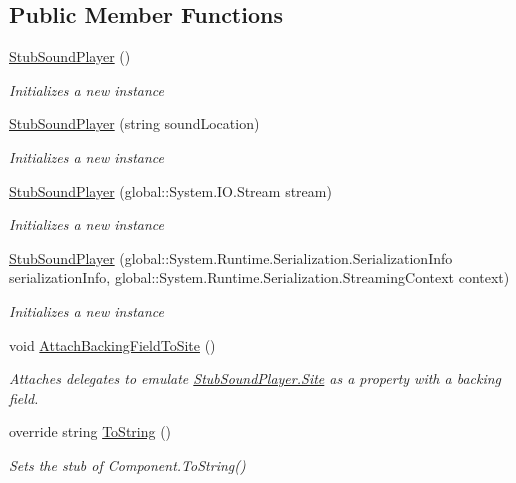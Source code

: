 \subsection*{Public Member Functions}
\begin{DoxyCompactItemize}
\item 
\hyperlink{class_system_1_1_media_1_1_fakes_1_1_stub_sound_player_a79a08a975afa2796896dbefc9a7a7f41}{Stub\-Sound\-Player} ()
\begin{DoxyCompactList}\small\item\em Initializes a new instance\end{DoxyCompactList}\item 
\hyperlink{class_system_1_1_media_1_1_fakes_1_1_stub_sound_player_a643aa3ee478e61c9316553f329a3b035}{Stub\-Sound\-Player} (string sound\-Location)
\begin{DoxyCompactList}\small\item\em Initializes a new instance\end{DoxyCompactList}\item 
\hyperlink{class_system_1_1_media_1_1_fakes_1_1_stub_sound_player_a50cb0c9e73c53eb486bd72fe1380ac85}{Stub\-Sound\-Player} (global\-::\-System.\-I\-O.\-Stream stream)
\begin{DoxyCompactList}\small\item\em Initializes a new instance\end{DoxyCompactList}\item 
\hyperlink{class_system_1_1_media_1_1_fakes_1_1_stub_sound_player_a9d2be66c9187fcc404b3b2d211889a9b}{Stub\-Sound\-Player} (global\-::\-System.\-Runtime.\-Serialization.\-Serialization\-Info serialization\-Info, global\-::\-System.\-Runtime.\-Serialization.\-Streaming\-Context context)
\begin{DoxyCompactList}\small\item\em Initializes a new instance\end{DoxyCompactList}\item 
void \hyperlink{class_system_1_1_media_1_1_fakes_1_1_stub_sound_player_a0e514aa3ca821b44c505ae56a9f5af15}{Attach\-Backing\-Field\-To\-Site} ()
\begin{DoxyCompactList}\small\item\em Attaches delegates to emulate \hyperlink{class_system_1_1_media_1_1_fakes_1_1_stub_sound_player_ac984de05778e03112d762263e5cf0135}{Stub\-Sound\-Player.\-Site} as a property with a backing field.\end{DoxyCompactList}\item 
override string \hyperlink{class_system_1_1_media_1_1_fakes_1_1_stub_sound_player_a93f721bac224abc60478febd4d249f3a}{To\-String} ()
\begin{DoxyCompactList}\small\item\em Sets the stub of Component.\-To\-String()\end{DoxyCompactList}\end{DoxyCompactItemize}
